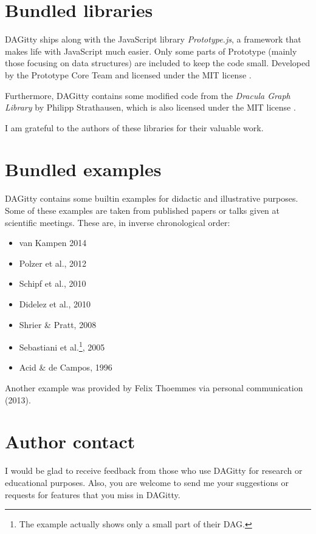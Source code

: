 \documentclass[a4paper]{article} %
\newcommand{\pp}{DAGitty\xspace}
\begin{document}
\section{Bundled libraries}

\pp ships along with the JavaScript library \emph{Prototype.js}, 
a framework that makes life with JavaScript much easier. Only some 
  parts of Prototype (mainly those focusing on data structures) are included to keep the code small. Developed
  by the Prototype Core Team and licensed under the MIT license \cite{Prototype2010}. 

Furthermore, \pp contains some modified code from the \emph{Dracula Graph Library} by 
Philipp Strathausen, which is also licensed under the MIT license \cite{Dracula2010}. 

I am grateful to the authors of these libraries for their valuable work. 

\section{Bundled examples}

\pp contains some builtin examples for didactic and illustrative purposes. 
Some of these examples are taken from published papers or talks given at 
scientific meetings. These are, in inverse chronological order: 

\begin{itemize}
 \item van Kampen 2014 \cite{Kampen2014} 
 \item Polzer et al., 2012 \cite{Polzer2012}
 \item Schipf et al., 2010 \cite{Schipf2010}
 \item Didelez et al., 2010 \cite{Didelez2010}
 \item Shrier \& Pratt, 2008 \cite{ShrierP2008}
 \item Sebastiani et al.\footnote{The example actually shows only a small part of their DAG.}, 
    2005 \cite{Sebastiani2005}
 \item Acid \& de Campos, 1996 \cite{Acid1996}
\end{itemize}

Another example was provided by Felix Thoemmes 
via personal communication (2013).


\section{Author contact}

I would be glad to receive feedback from those 
who use \pp for research or educational purposes. 
Also, you are welcome to send me your 
suggestions or requests for features that 
you miss in \pp. 
\end{document}
